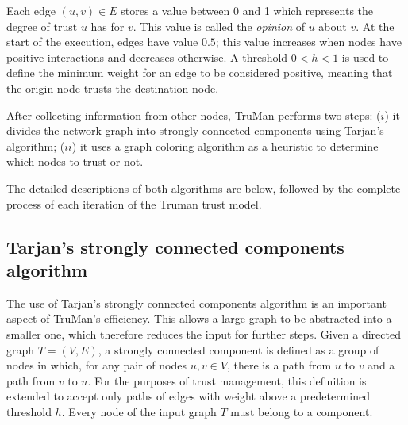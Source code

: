 \documentclass[conference]{IEEEtran}
\begin{document}
Each edge $(u, v) \in E$ stores a value between 0 and 1 which represents the degree of trust $u$ has for $v$.
This value is called the \textit{opinion} of $u$ about $v$.
At the start of the execution, edges have value $0.5$; this value increases when nodes have positive interactions and decreases otherwise.
A threshold $0 < h < 1$ is used to define the minimum weight for an edge to be considered positive, meaning that the origin node trusts the destination node.

After collecting information from other nodes, TruMan performs two steps: ($i$) it divides the network graph into strongly connected components using Tarjan's algorithm; ($ii$) it uses a graph coloring algorithm as a heuristic to determine which nodes to trust or not.



The detailed descriptions of both algorithms are below, followed by the complete process of each iteration of the Truman trust model.



\subsection{Tarjan's strongly connected components algorithm}
\label{section:tarjan}
The use of Tarjan's strongly connected components algorithm \cite{tarjan1972depth} is an important aspect of TruMan's efficiency.
This allows a large graph to be abstracted into a smaller one, which therefore reduces the input for further steps.
Given a directed graph $T = (V,E)$, a strongly connected component is defined as a group of nodes in which, for any pair of nodes $u, v \in V$, there is a path from $u$ to $v$ and a path from $v$ to $u$.
For the purposes of trust management, this definition is extended to accept only paths of edges with weight above a predetermined threshold $h$.
Every node of the input graph $T$ must belong to a component.
\end{document}
